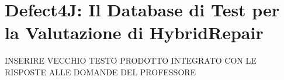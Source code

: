 \chapter{Defect4J: Il Database di Test per la Valutazione di HybridRepair}

INSERIRE VECCHIO TESTO PRODOTTO INTEGRATO CON LE RISPOSTE ALLE DOMANDE DEL PROFESSORE